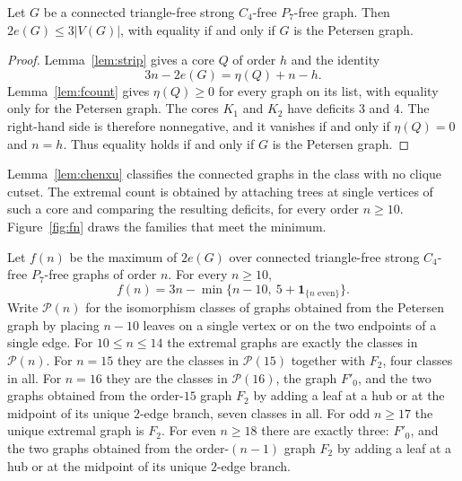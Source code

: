 \documentclass[ASNA]{USG}
\theoremstyle{WBstyletwo}
\numberwithin{equation}{section}
\begin{document}
\begin{theorem}\label{thm:tf}
Let $G$ be a connected triangle-free strong $C_4$-free $P_7$-free graph. Then $2e(G)\le 3|V(G)|$, with equality if and only if $G$ is the Petersen graph.
\end{theorem}

\begin{proof}
Lemma~\ref{lem:strip} gives a core $Q$ of order $h$ and the identity
\[
3n-2e(G)=\eta(Q)+n-h.
\]
Lemma~\ref{lem:fcount} gives $\eta(Q)\ge 0$ for every graph on its list, with equality only for the Petersen graph. The cores $K_1$ and $K_2$ have deficits $3$ and $4$. The right-hand side is therefore nonnegative, and it vanishes if and only if $\eta(Q)=0$ and $n=h$. Thus equality holds if and only if $G$ is the Petersen graph.
\end{proof}

Lemma~\ref{lem:chenxu} classifies the connected graphs in the class with no clique cutset. The extremal count is obtained by attaching trees at single vertices of such a core and comparing the resulting deficits, for every order $n\ge 10$. Figure~\ref{fig:fn} draws the families that meet the minimum.

\begin{theorem}\label{thm:fn}
Let $f(n)$ be the maximum of $2e(G)$ over connected triangle-free strong $C_4$-free $P_7$-free graphs of order $n$. For every $n\ge 10$,
\[
f(n)=3n-\min\bigl\{n-10,\ 5+\mathbf{1}_{\{n\text{ even}\}}\bigr\}.
\]
Write $\mathcal P(n)$ for the isomorphism classes of graphs obtained from the Petersen graph by placing $n-10$ leaves on a single vertex or on the two endpoints of a single edge. For $10\le n\le 14$ the extremal graphs are exactly the classes in $\mathcal P(n)$. For $n=15$ they are the classes in $\mathcal P(15)$ together with $F_2$, four classes in all. For $n=16$ they are the classes in $\mathcal P(16)$, the graph $F'_0$, and the two graphs obtained from the order-$15$ graph $F_2$ by adding a leaf at a hub or at the midpoint of its unique $2$-edge branch, seven classes in all. For odd $n\ge 17$ the unique extremal graph is $F_2$. For even $n\ge 18$ there are exactly three: $F'_0$, and the two graphs obtained from the order-$(n-1)$ graph $F_2$ by adding a leaf at a hub or at the midpoint of its unique $2$-edge branch.
\end{theorem}
\end{document}
